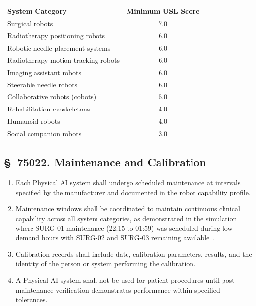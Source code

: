 \documentclass[11pt,letterpaper]{article}
\begin{document}
\begin{center}
\begin{tabular}{lc}
\toprule
\textbf{System Category} & \textbf{Minimum USL Score} \\
\midrule
Surgical robots & 7.0 \\
Radiotherapy positioning robots & 6.0 \\
Robotic needle-placement systems & 6.0 \\
Radiotherapy motion-tracking robots & 6.0 \\
Imaging assistant robots & 6.0 \\
Steerable needle robots & 6.0 \\
Collaborative robots (cobots) & 5.0 \\
Rehabilitation exoskeletons & 4.0 \\
Humanoid robots & 4.0 \\
Social companion robots & 3.0 \\
\bottomrule
\end{tabular}
\end{center}

\subsection{\S~75022. Maintenance and Calibration}

\begin{enumerate}[label=(\alph*)]
\item Each Physical AI system shall undergo scheduled maintenance at intervals
  specified by the manufacturer and documented in the robot capability profile.

\item Maintenance windows shall be coordinated to maintain continuous clinical
  capability across all system categories, as demonstrated in the simulation
  where SURG-01 maintenance (22:15 to 01:59) was scheduled during low-demand
  hours with SURG-02 and SURG-03 remaining
  available~\cite{newtrial2026}.

\item Calibration records shall include date, calibration parameters, results,
  and the identity of the person or system performing the calibration.

\item A Physical AI system shall not be used for patient procedures until
  post-maintenance verification demonstrates performance within specified
  tolerances.
\end{enumerate}
\end{document}
